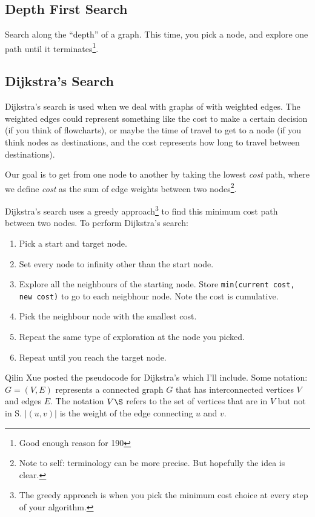 \documentclass{tufte-handout}
\newcommand{\code}[1]{\colorbox{light-gray}{\texttt{#1}}}
\begin{document}
\subsection{Depth First Search}
Search along the ``depth'' of a graph. This time, you pick a node, and
explore one path until it terminates\footnote{Good enough reason for
  190}.  
\subsection{Dijkstra's Search}
Dijkstra's search is used when we deal with graphs of with weighted
edges. The weighted edges could represent something like the cost to
make a certain decision (if you think of flowcharts), or maybe the
time of travel to get to a node (if you think nodes as destinations, and
the cost represents how long to travel between destinations).

Our goal is to get from one node to another by taking the lowest
\textit{cost} path, where we define \textit{cost} as the sum of edge weights
between two nodes\footnote{Note to self: terminology can be more
  precise. But hopefully the idea is clear.}.

Dijkstra's search uses a greedy approach\footnote{The greedy approach
  is when you pick the minimum cost choice at every step of your
  algorithm.} to find this minimum cost path between two nodes. To
perform Dijkstra's search:

\begin{enumerate}
\item Pick a start and target node.
\item Set every node to infinity other than the start node.
\item Explore all the neighbours of the starting node. Store
  \code{min(current cost, new cost)} to go to each neigbhour node. Note the cost is cumulative.
  \item Pick the neighbour node with the smallest cost.
  \item Repeat the same type of exploration at the node you picked.
    \item Repeat until you reach the target node.
\end{enumerate}

Qilin Xue posted the pseudocode for Dijkstra's which I'll
include. Some notation: $G=(V,E)$ represents a connected graph $G$
that has interconnected vertices $V$ and edges $E$. The notation $V\S$
refers to the set of vertices that are in $V$ but not in S. $|(u,v)|$
is the weight of the edge connecting $u$ and $v$.
\end{document}
